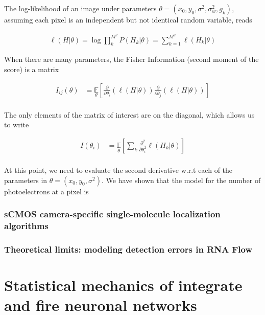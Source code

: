 \documentclass{ucetd}
\begin{document}
\vspace{0.2in}
The log-likelihood of an image under parameters $\theta = (x_{0},y_{0},\sigma^{2},\sigma_{w}^{2},g_{k})$, assuming each pixel is an independent but not identical random variable, reads

\begin{align*}
\ell(H|\theta) = \log\prod_{k}^{M^{2}} P(H_{k}|\theta) = \sum_{k=1}^{M^{2}} \ell (H_{k}|\theta)
\end{align*}


When there are many parameters, the Fisher Information (second moment of the score) is a matrix

\begin{align*}
I_{ij}(\theta) &= \underset{\theta}{\mathbb{E}}\left[\frac{\partial}{\partial\theta_{i}} \left(\ell(H|\theta)\right)\frac{\partial}{\partial\theta_{j}} \left(\ell(H|\theta)\right)\right]\\
\end{align*}

The only elements of the matrix of interest are on the diagonal, which allows us to write

\begin{align*}
I(\theta_{i}) &= \underset{\theta}{\mathbb{E}}\left[\sum_{k}\frac{\partial^{2}}{\partial\theta_{i}^{2}}  \ell (H_{k}|\theta)\right]\\
\end{align*}

At this point, we need to evaluate the second derivative w.r.t each of the parameters in $\theta = (x_{0},y_{0},\sigma^{2})$. We have shown that the model for the number of photoelectrons at a pixel is




\subsection{sCMOS camera-specific single-molecule localization algorithms}

\subsection{Theoretical limits: modeling detection errors in RNA Flow}


\chapter{Statistical mechanics of integrate and fire neuronal networks}
\end{document}
